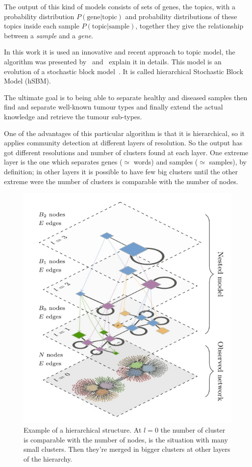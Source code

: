 The output of this kind of models consists of sets of genes, the topics, with a probability distribution $P(\text{gene} | \text{topic})$ and probability distributions of these topics inside each sample $P(\text{topic} | \text{sample})$, together they give the relationship between a \textit{sample} and a \textit{gene}.

In this work it is used an innovative and recent approach to topic model, the algorithm was presented by~\cite{gerlach2018network} and~\cite{Peixoto2017} explain it in details. This model is an evolution of a stochastic block model~\cite{Holland1983}. It is called hierarchical Stochastic Block Model (hSBM).

The ultimate goal is to being able to separate healthy and diseased samples then find and separate well-known tumour types and finally extend the actual knowledge and retrieve the tumour sub-types.

One of the advantages of this particular algorithm is that it is hierarchical, so it applies community detection at different layers of resolution. So the output has got different resolutions and number of clusters found at each layer. One extreme layer is the one which separates genes ($\simeq$ words) and samples ($\simeq$ samples), by definition; in other layers it is possible to have few big clusters until the other extreme were the number of clusters is comparable with the number of nodes.
\begin{figure}[htb!]
  \centering
  \includegraphics[width=0.6\linewidth]{pictures/topic/peixioto_hierarchic.jpg}
  \caption{Example of a hierarchical structure. At $l=0$ the number of cluster is comparable with the number of nodes, is the situation with many small clusters. Then they're merged in bigger clusters at other layers of the hierarchy.}
  \label{fig:topic_peixioto_hierarchic}
\end{figure}


